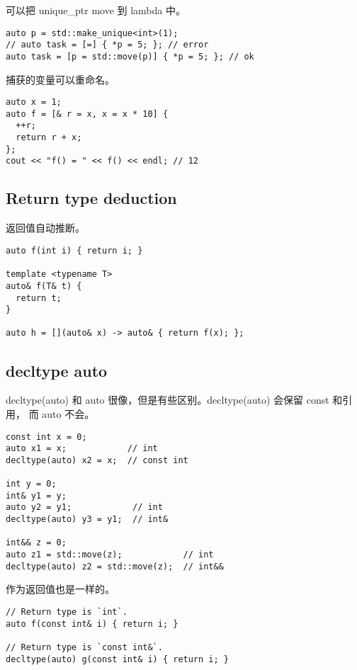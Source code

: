 可以把 unique\_ptr move 到 lambda 中。

\begin{verbatim}
auto p = std::make_unique<int>(1);
// auto task = [=] { *p = 5; }; // error
auto task = [p = std::move(p)] { *p = 5; }; // ok
\end{verbatim}

捕获的变量可以重命名。

\begin{verbatim}
auto x = 1;
auto f = [& r = x, x = x * 10] {
  ++r;
  return r + x;
};
cout << "f() = " << f() << endl; // 12
\end{verbatim}

\subsection{Return type deduction}

返回值自动推断。

\begin{verbatim}
auto f(int i) { return i; }

template <typename T>
auto& f(T& t) {
  return t;
}

auto h = [](auto& x) -> auto& { return f(x); };
\end{verbatim}

\subsection{decltype auto}

decltype(auto) 和 auto 很像，但是有些区别。decltype(auto) 会保留 const 和引用，
而 auto 不会。

\begin{verbatim}
const int x = 0;
auto x1 = x;            // int
decltype(auto) x2 = x;  // const int

int y = 0;
int& y1 = y;
auto y2 = y1;            // int
decltype(auto) y3 = y1;  // int&

int&& z = 0;
auto z1 = std::move(z);            // int
decltype(auto) z2 = std::move(z);  // int&&
\end{verbatim}

作为返回值也是一样的。

\begin{verbatim}
// Return type is `int`.
auto f(const int& i) { return i; }

// Return type is `const int&`.
decltype(auto) g(const int& i) { return i; }
\end{verbatim}

